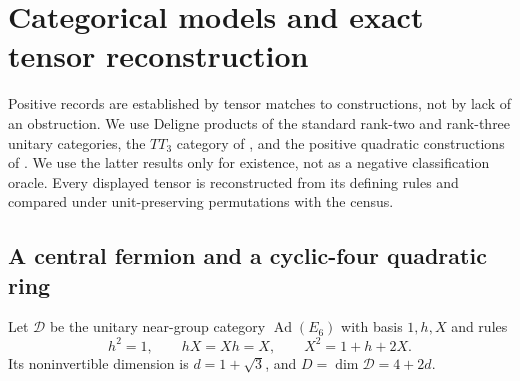\section{Categorical models and exact tensor reconstruction}\label{sec:positive}
Positive records are established by tensor matches to constructions,
not by lack of an obstruction. We use Deligne products of the standard
rank-two and rank-three unitary categories, the $TT_3$ category of
\cite[Definition~2.5]{EM}, and the positive quadratic constructions
of \cite[Proposition~5.1, Corollary~5.8]{MY}. We use the latter results
only for existence, not as a negative classification oracle.
Every displayed tensor is reconstructed from its defining rules and
compared under unit-preserving permutations with the census.

\subsection{A central fermion and a cyclic-four quadratic ring}
Let $\mathcal D$ be the unitary near-group category
$\operatorname{Ad}(E_6)$ with basis $1,h,X$ and rules
\begin{equation}\label{eq:E6}
 h^2=1,\qquad hX=Xh=X,\qquad X^2=1+h+2X.
\end{equation}
Its noninvertible dimension is $d=1+\sqrt3$, and
$D=\dim\mathcal D=4+2d$.

